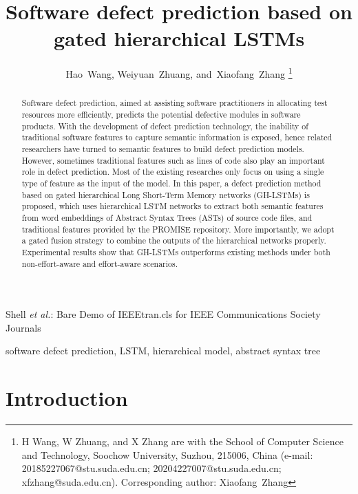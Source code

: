 \documentclass[journal]{IEEEtran}
\begin{document}
\title{Software defect prediction based on gated hierarchical LSTMs}

\author{Hao~Wang,
        Weiyuan~Zhuang,
        and~Xiaofang~Zhang%
\thanks{H Wang, W Zhuang, and X Zhang are with the School of Computer Science and Technology, Soochow University, Suzhou, 215006, China (e-mail: 20185227067@stu.suda.edu.cn; 20204227007@stu.suda.edu.cn; xfzhang@suda.edu.cn). Corresponding author: Xiaofang~Zhang}}


%
{Shell \MakeLowercase{\textit{et al.}}: Bare Demo of IEEEtran.cls for IEEE Communications Society Journals}

\maketitle

\begin{abstract}
Software defect prediction, aimed at assisting software practitioners in allocating test resources more efficiently, predicts the potential defective modules in software products. With the development of defect prediction technology, the inability of traditional software features to capture semantic information is exposed, hence related researchers have turned to semantic features to build defect prediction models. However, sometimes traditional features such as lines of code also play an important role in defect prediction. Most of the existing researches only focus on using a single type of feature as the input of the model. In this paper, a defect prediction method based on gated hierarchical Long Short-Term Memory networks (GH-LSTMs) is proposed, which uses hierarchical LSTM networks to extract both semantic features from word embeddings of Abstract Syntax Trees (ASTs) of source code files, and traditional features provided by the PROMISE repository. More importantly, we adopt a gated fusion strategy to combine the outputs of the hierarchical networks properly. Experimental results show that GH-LSTMs outperforms existing methods under both non-effort-aware and effort-aware scenarios.
\end{abstract}


\begin{IEEEkeywords}
software defect prediction, LSTM, hierarchical model, abstract syntax tree
\end{IEEEkeywords}

\IEEEpeerreviewmaketitle

\section{Introduction}
\end{document}

